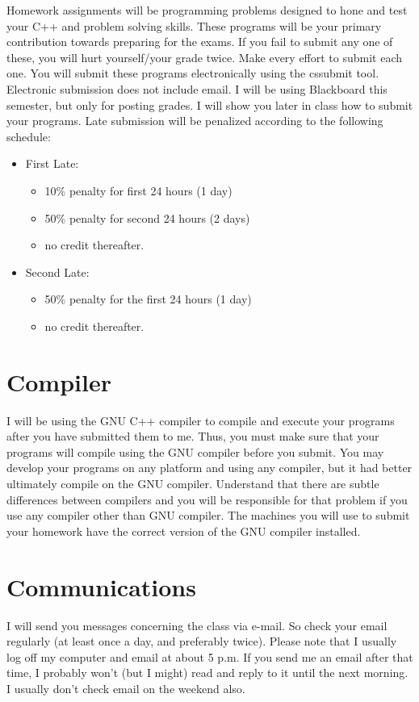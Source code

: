 \documentclass{article}
\begin{document}
Homework assignments will be programming problems designed to hone and test your C++ and problem solving skills.
These programs will be your primary contribution towards preparing for the exams.
If you fail to submit any one of these, you will hurt yourself/your grade twice.
Make every effort to submit each one.
You will submit these programs electronically using the cssubmit tool.
Electronic submission does not include email.
I will be using Blackboard this semester, but only for posting grades. %
I will show you later in class how to submit your programs.
Late submission will be penalized according to the following schedule:

\begin{itemize}
	\item First Late:
		\begin{itemize}
			\item 10\% penalty for first 24 hours (1 day)
			\item 50\% penalty for second 24 hours (2 days)
			\item no credit thereafter.
		\end{itemize}
	\item Second Late:
		\begin{itemize}
			\item 50\% penalty for the first 24 hours (1 day)
			\item no credit thereafter.
		\end{itemize}
\end{itemize}

\section{Compiler}
I will be using the GNU C++ compiler to compile and execute your programs after you have submitted them to me.
Thus, you must make sure that your programs will compile using the GNU compiler before you submit.
You may develop your programs on any platform and using any compiler, but it had better ultimately compile on the GNU compiler.
Understand that there are subtle differences between compilers and you will be responsible for that problem if you use any compiler other than GNU compiler.
The machines you will use to submit your homework have the correct version of the GNU compiler installed.

\section{Communications}
I will send you messages concerning the class via e-mail.
So check your email regularly (at least once a day, and preferably twice).
Please note that I usually log off my computer and email at about 5 p.m.
If you send me an email after that time, I probably won't (but I might) read and reply to it until the next morning.
I usually don't check email on the weekend also.
\end{document}
